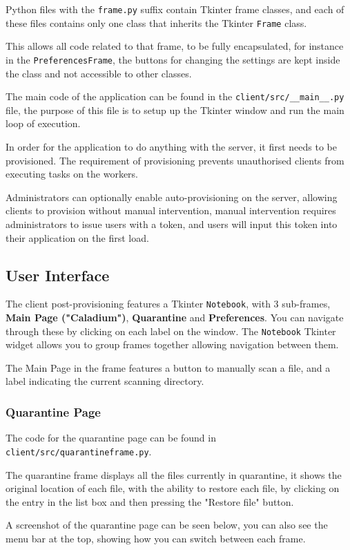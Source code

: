 Python files with the \texttt{frame.py} suffix contain Tkinter frame classes,
and each of these files contains only one class that inherits the Tkinter \texttt{Frame} class.

This allows all code related to that frame, to be fully encapsulated,
for instance in the \texttt{PreferencesFrame}, the buttons for changing the settings
are kept inside the class and not accessible to other classes.

The main code of the application can be found in the
\texttt{client/src/\_\_main\_\_.py} file,
the purpose of this file is to setup up the Tkinter window and run the main loop of execution.

In order for the application to do anything with the server,
it first needs to be provisioned.
The requirement of provisioning prevents unauthorised
clients from executing tasks on the workers.

Administrators can optionally enable auto-provisioning on the server,
allowing clients to provision without manual intervention,
manual intervention requires administrators to issue users with a token,
and users will input this token into their application on the first load.

\subsection{User Interface}
The client post-provisioning features a Tkinter \texttt{Notebook},
with 3 sub-frames, \textbf{Main Page ("Caladium")},
\textbf{Quarantine} and \textbf{Preferences}.
You can navigate through these by clicking on each label on the window.
The \texttt{Notebook} Tkinter widget allows you to
group frames together allowing navigation between them.

The Main Page in the frame features a button to manually scan a file,
and a label indicating the current scanning directory.

\subsubsection{Quarantine Page}
The code for the quarantine page can be found in
\texttt{client/src/quarantineframe.py}.

The quarantine frame displays all the files currently in quarantine,
it shows the original location of each file,
with the ability to restore each file,
by clicking on the entry in the list box
and then pressing the "Restore file" button.

A screenshot of the quarantine page can be seen below,
you can also see the menu bar at the top,
showing how you can switch between each frame.

